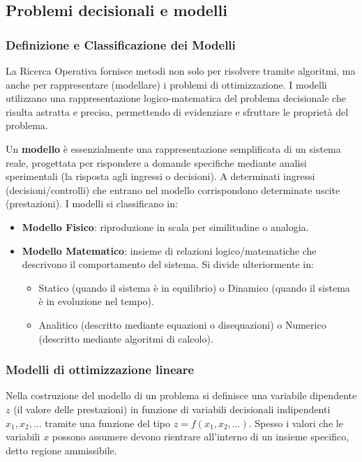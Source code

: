 \documentclass[12pt]{extarticle} %
\begin{document}
\subsection{Problemi decisionali e modelli}
\subsubsection{Definizione e Classificazione dei Modelli}
La Ricerca Operativa fornisce metodi non solo per risolvere tramite algoritmi, ma anche per rappresentare (modellare) i problemi di ottimizzazione. I modelli utilizzano una rappresentazione logico-matematica del problema decisionale che risulta astratta e precisa, permettendo di evidenziare e sfruttare le proprietà del problema.

Un \textbf{modello} è essenzialmente una rappresentazione semplificata di un sistema reale, progettata per rispondere a domande specifiche mediante analisi sperimentali (la risposta agli ingressi o decisioni). A determinati ingressi (decisioni/controlli) che entrano nel modello corrispondono determinate uscite (prestazioni). I modelli si classificano in:
\begin{itemize}
    \item \textbf{Modello Fisico}: riproduzione in scala per similitudine o analogia.
    \item \textbf{Modello Matematico}: insieme di relazioni logico/matematiche che descrivono il comportamento del sistema. Si divide ulteriormente in:
    \begin{itemize}
        \item Statico (quando il sistema è in equilibrio) o Dinamico (quando il sistema è in evoluzione nel tempo).
        \item Analitico (descritto mediante equazioni o disequazioni) o Numerico (descritto mediante algoritmi di calcolo).
    \end{itemize}
\end{itemize}

\subsubsection{Modelli di ottimizzazione lineare}
Nella costruzione del modello di un problema si definisce una variabile dipendente $z$ (il valore delle prestazioni) in funzione di variabili decisionali indipendenti $x_1, x_2, \dots$ tramite una funzione del tipo $z=f(x_1, x_2, \dots)$. Spesso i valori che le variabili $x$ possono assumere devono rientrare all'interno di un insieme specifico, detto regione ammissibile.
\end{document}
